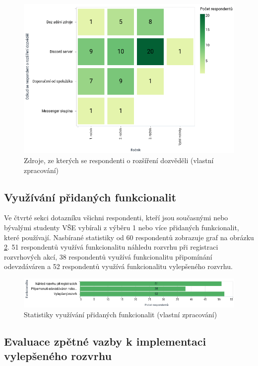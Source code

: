 \begin{figure}[htbp!]\centering
    \includegraphics[width=\textwidth]{img/zdroj-instalace.png}
    \caption{Zdroje, ze kterých se respondenti o rozšíření dozvěděli (vlastní zpracování)}
    \label{fig:zdroj-instalace}
\end{figure}

\subsection{Využívání přidaných funkcionalit}

Ve čtvrté sekci dotazníku všichni respondenti, kteří jsou současnými nebo bývalými studenty VŠE vybírali z výběru 1 nebo více přidaných funkcionalit, které používají. Nasbírané statistiky od 60 respondentů zobrazuje graf na obrázku \ref{fig:features-data}. 51 respondentů využívá funkcionalitu náhledu rozvrhu při registraci rozvrhových akcí, 38 respondentů využívá funkcionalitu připomínání odevzdáváren a 52 respondentů využívá funkcionalitu vylepšeného rozvrhu. 

\begin{figure}[htbp!]\centering
    \includegraphics[width=\textwidth]{img/features.png}
    \caption{Statistiky využívání přidaných funkcionalit (vlastní zpracování)}
    \label{fig:features-data}
\end{figure}

\subsection{Evaluace zpětné vazby k implementaci vylepšeného rozvrhu}

